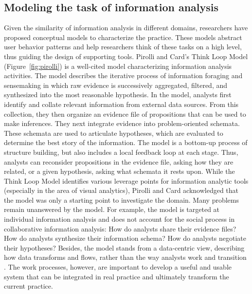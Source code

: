 \subsection{Modeling the task of information analysis}
Given the similarity of information analysis in different domains, researchers have proposed conceptual models to characterize the practice. These models abstract user behavior patterns and help researchers think of these tasks on a high level, thus guiding the design of supporting tools. Pirolli and Card’s \citep{Pirolli2005}
Think Loop Model (Figure~\ref{fig:pirolli}) is a well-cited model characterizing information
analysis activities. The model describes the iterative process of information
foraging and sensemaking in which raw evidence is successively aggregated,
filtered, and synthesized into the most reasonable hypothesis. In the model, analysts first
identify and collate relevant information from external data sources. From this
collection, they then organize an evidence file of propositions that can be used
to make inferences. They next integrate evidence into problem-oriented schemata.
These schemata are used to articulate hypotheses, which are evaluated to
determine the best story of the information. The model is a bottom-up process of
structure building, but also includes a local feedback loop at each stage. Thus,
analysts can reconsider propositions in the evidence file, asking how they are
related, or a given hypothesis, asking what schemata it rests upon. While the
Think Loop Model identifies various leverage points for information analytic
tools (especially in the area of visual analytics), Pirolli and Card acknowledged that the
model was only a starting point to investigate the domain. Many problems remain
unanswered by the model. For example, the model is targeted at individual
information analysis and does not account for the social process in
collaborative information analysis: How do analysts share their evidence files?
How do analysts synthesize their information schema? How do analysts negotiate
their hypotheses? Besides, the model stands from a data-centric view, describing
how data transforms and flows, rather than the way analysts work and transition
\citep{Kang2012b}. The work processes, however, are important to
develop a useful and usable system that can be integrated in real practice and
ultimately transform the current practice.

